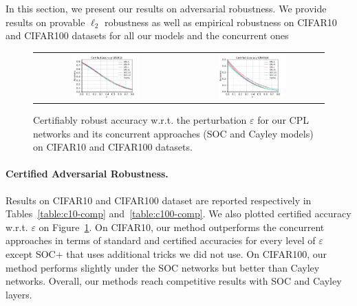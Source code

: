 In this section, we present our results on adversarial robustness.
We provide results on provable $\ell_2$ robustness as well as empirical robustness on CIFAR10 and CIFAR100 datasets for all our models and the concurrent ones

\begin{figure}[h]
    \centering
    \begin{tabular}{cc}
    \includegraphics[width =0.48\textwidth]{sections/4_certification/images/cert_acc_eps_c10.pdf} & \includegraphics[width =0.48\textwidth]{sections/4_certification/images/cert_acc_eps_c100.pdf}
    \end{tabular}
    \caption{Certifiably robust accuracy  w.r.t. the perturbation $\varepsilon$ for our CPL networks and its concurrent approaches (SOC and Cayley models) on CIFAR10 and CIFAR100 datasets.}
    \label{fig:cert-acc}
\end{figure}

\paragraph{Certified Adversarial Robustness.} 
Results on CIFAR10 and CIFAR100 dataset are reported respectively in Tables~\ref{table:c10-comp} and~\ref{table:c100-comp}. We also plotted certified accuracy w.r.t. $\varepsilon$ on Figure~\ref{fig:cert-acc}. On CIFAR10, our method outperforms the concurrent approaches in terms of standard and certified accuracies for every level of $\varepsilon$ except SOC+ that uses additional tricks we did not use. On CIFAR100, our method performs slightly under the SOC networks but better than Cayley networks. Overall, our methods reach competitive results with SOC and Cayley layers. 

